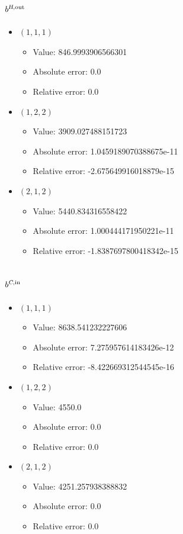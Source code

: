 \documentclass{article}%
\begin{document}
\subsection{$b^{\textsl{H},\text{out}}$}%
\begin{itemize}%
	\item $(1, 1, 1)$%
	\begin{itemize}%
		\item Value: 846.9993906566301%
		\item Absolute error: 0.0%
		\item Relative error: 0.0%
	\end{itemize}%
	\item $(1, 2, 2)$%
	\begin{itemize}%
		\item Value: 3909.027488151723%
		\item Absolute error: 1.0459189070388675e-11%
		\item Relative error: -2.675649916018879e-15%
	\end{itemize}%
	\item $(2, 1, 2)$%
	\begin{itemize}%
		\item Value: 5440.834316558422%
		\item Absolute error: 1.000444171950221e-11%
		\item Relative error: -1.8387697800418342e-15%
	\end{itemize}%
\end{itemize}%
\subsection{$b^{\textsl{C},\text{in}}$}%
\begin{itemize}%
	\item $(1, 1, 1)$%
	\begin{itemize}%
		\item Value: 8638.541232227606%
		\item Absolute error: 7.275957614183426e-12%
		\item Relative error: -8.422669312544545e-16%
	\end{itemize}%
	\item $(1, 2, 2)$%
	\begin{itemize}%
		\item Value: 4550.0%
		\item Absolute error: 0.0%
		\item Relative error: 0.0%
	\end{itemize}%
	\item $(2, 1, 2)$%
	\begin{itemize}%
		\item Value: 4251.257938388832%
		\item Absolute error: 0.0%
		\item Relative error: 0.0%
	\end{itemize}%
\end{itemize}%
\end{document}
